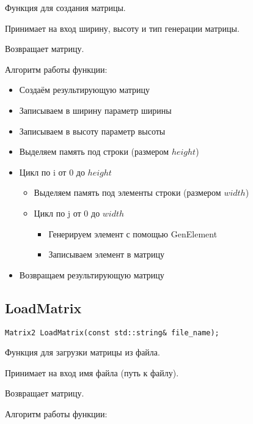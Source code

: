 \documentclass[12pt,a4paper]{article}  %
\begin{document}
	Функция для создания матрицы.

	Принимает на вход ширину, высоту и тип генерации матрицы.

	Возвращает матрицу.

	Алгоритм работы функции:

	\begin{itemize}
		\item Создаём результирующую матрицу
		\item Записываем в ширину параметр ширины
		\item Записываем в высоту параметр высоты
		\item Выделяем память под строки (размером $ height $)
		\item Цикл по i от 0 до $ height $
		\begin{itemize}
			\item Выделяем память под элементы строки (размером $ width $)
			\item Цикл по j от 0 до $ width $
			\begin{itemize}
				  \item Генерируем элемент с помощью GenElement
				  \item Записываем элемент в матрицу
			\end{itemize}
		\end{itemize}
		\item Возвращаем результирующую матрицу
	\end{itemize}

	\subsection*{LoadMatrix}

	\begin{lstlisting}[label={lst:LoadMatrix}]
		Matrix2 LoadMatrix(const std::string& file_name);
	\end{lstlisting}

	Функция для загрузки матрицы из файла.

	Принимает на вход имя файла (путь к файлу).

	Возвращает матрицу.

	Алгоритм работы функции:
\end{document}
